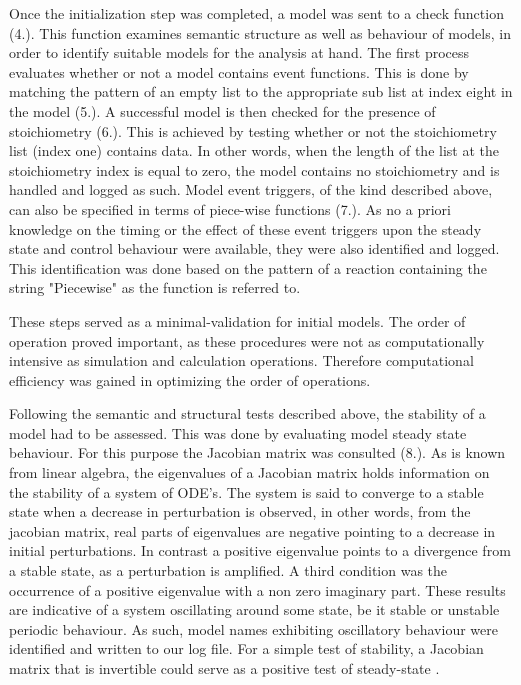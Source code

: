 Once the initialization step was completed, a model was sent to a check function (4.). This function examines semantic structure as well as behaviour of models, in order to identify suitable models for the analysis at hand. The first process evaluates whether or not a model contains event functions. This is done by matching the pattern of an empty list to the appropriate sub list at index eight in the model (5.). A successful model is then checked for the presence of stoichiometry (6.). This is achieved by testing whether or not the stoichiometry list (index one) contains data. In other words, when the length of the list at the stoichiometry index is equal to zero, the model contains no stoichiometry and is handled and logged as such. Model event triggers, of the kind described above, can also be specified in terms of piece-wise functions (7.). As no a priori knowledge on the timing or the effect of these event triggers upon the steady state and control behaviour were available, they were also identified and logged. This identification was done based on the pattern of a reaction containing the string "Piecewise" as the function is referred to. 

These steps served as a minimal-validation for initial models. The order of operation proved important, as these procedures were not as computationally intensive as simulation and calculation operations. Therefore computational efficiency was gained in optimizing the order of operations. 

Following the semantic and structural tests described above, the stability of a model had to be assessed. This was done by evaluating model steady state behaviour. For this purpose the Jacobian matrix was consulted (8.). As is known from linear algebra, the eigenvalues of a Jacobian matrix holds information on the stability of a system of ODE's. The system is said to converge to a stable state when a decrease in perturbation is observed, in other words, from the jacobian matrix, real parts of eigenvalues are negative pointing to a decrease in initial perturbations. In contrast a positive eigenvalue points to a divergence from a stable state, as a perturbation is amplified. A third condition was the occurrence of a positive eigenvalue with a non zero imaginary part. These results are indicative of a system oscillating around some state, be it stable or unstable periodic behaviour. As such, model names exhibiting oscillatory behaviour were identified and written to our log file. For a simple test of stability, a Jacobian matrix that is invertible could serve as a positive test of steady-state \cite{Hofmeyr2001}.  

